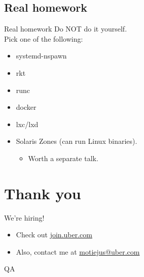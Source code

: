\documentclass[14pt]{beamer}
\begin{document}
\subsection{Real homework}
\begin{frame}{Real homework}
    Do NOT do it yourself. \\
    \pause
    Pick one of the following:
    \begin{itemize}[<+(1)->]
        \item systemd-nspawn
        \item rkt
        \item runc
        \item docker
        \item lxc/lxd
        \item Solaris Zones (can run Linux binaries).
            \begin{itemize}
                \item Worth a separate talk.
            \end{itemize}
    \end{itemize}
\end{frame}


\section{Thank you}
\begin{frame}{We're hiring!}
    \begin{itemize}
        \item Check out \href{http://join.uber.com}{join.uber.com}
        \item Also, contact me at \href{mailto:motiejus@uber.com}{motiejus@uber.com}
    \end{itemize}
\end{frame}

\begin{frame}{QA}
\end{frame}
\end{document}
